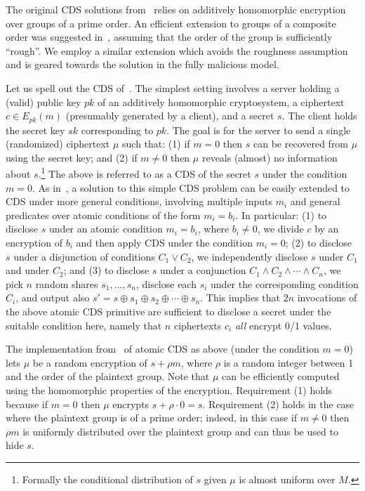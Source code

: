 \documentclass{article}
\begin{document}
The original CDS solutions from~\cite{AIR01}  relies on additively homomorphic
encryption over groups of a prime order. An efficient extension to
groups of a composite order was suggested in~\cite{L05}, assuming
that the order of the group is sufficiently ``rough''. We employ a
similar extension which avoids the roughness assumption and is
geared towards the solution in the fully malicious model.
 

Let us spell out the CDS of~\cite{AIR01}. The simplest
setting involves a server holding a (valid) public key $pk$ of an additively
homomorphic cryptosystem, a ciphertext $c\in E_{pk}(m)$ (presumably
generated by a client), and a secret $s$. The client holds the
secret key $sk$ corresponding to $pk$. The goal is for the server
to send a single (randomized) ciphertext $\mu$ such that: (1) if
$m=0$ then $s$ can be recovered from $\mu$ using the secret key;
and (2) if $m\neq 0$ then $\mu$ reveals (almost) no information
about $s$.\footnote{Formally the conditional distribution of $s$ given $\mu$ is almost uniform over $M$.} The above is referred to as a CDS of the secret $s$
under the condition $m=0$. As in~\cite{GIKM,AIR01}, a solution to
this simple CDS problem can be easily extended to CDS under more
general conditions, involving multiple inputs $m_i$ and general
predicates over atomic conditions of the form $m_i=b_i$. In
particular: (1) to disclose $s$ under an atomic condition
$m_i=b_i$, where $b_i\neq 0$, we divide $c$ by an encryption of
$b_i$ and then apply CDS under the condition $m_i=0$; (2) to
disclose $s$ under a disjunction of conditions $C_1\vee C_2$, we
independently disclose $s$ under $C_1$ and under $C_2$; and (3) to
disclose $s$ under a conjunction $C_1\wedge C_2\wedge \cdots \wedge
C_n$, we pick $n$ random shares $s_1,\ldots,s_n$, disclose each $s_i$ under the corresponding condition $C_i$,
and output also $s'=s\oplus s_1\oplus s_2\oplus\cdots\oplus s_n$. This implies that
$2n$ invocations of the above atomic CDS primitive are sufficient
to disclose a secret under the suitable condition here, namely that
$n$ ciphertexts $c_i$ {\em all} encrypt 0/1 values.

The implementation from~\cite{AIR01} of atomic CDS as above (under
the condition $m=0$) lets $\mu$ be a random encryption of $s+\rho
m$, where $\rho$ is a random integer between 1 and the order of the
plaintext group. Note that $\mu$ can be efficiently computed using
the homomorphic properties of the encryption. Requirement (1) holds
because if $m=0$ then $\mu$ encrypts $s+\rho\cdot 0=s$. Requirement
(2) holds in the case where the plaintext group is of a prime
order; indeed, in this case if $m\neq 0$ then $\rho m$ is uniformly
distributed over the plaintext group and can thus be used to hide
$s$.
\end{document}
